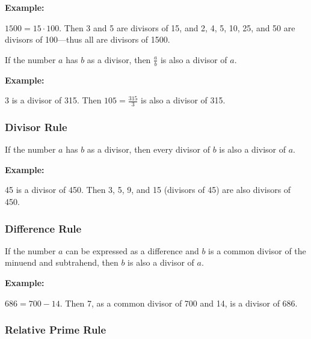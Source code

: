\textbf{Example:}
\vspace{\baselineskip}
 

\( 1500 = 15 \cdot 100 \). Then 3 and 5 are divisors of 15, and 2, 4, 5, 10, 25, and 50 are divisors of 100—thus all are divisors of 1500.


If the number \( a \) has \( b \) as a divisor, then \( \frac{a}{b} \) is also a divisor of \( a \). \\
\vspace{\baselineskip}

\textbf{Example:}
\vspace{\baselineskip}
 

3 is a divisor of 315. Then \( 105 = \frac{315}{3} \) is also a divisor of 315.

\subsubsection{Divisor Rule}

If the number \( a \) has \( b \) as a divisor, then every divisor of \( b \) is also a divisor of \( a \). \\
\vspace{\baselineskip}

\textbf{Example:}
\vspace{\baselineskip}
 

45 is a divisor of 450. Then 3, 5, 9, and 15 (divisors of 45) are also divisors of 450.

\subsubsection{Difference Rule}

If the number \( a \) can be expressed as a difference and \( b \) is a common divisor of the minuend and subtrahend, then \( b \) is also a divisor of \( a \). \\
\vspace{\baselineskip}

\textbf{Example:}
\vspace{\baselineskip}
 

\( 686 = 700 - 14 \). Then 7, as a common divisor of 700 and 14, is a divisor of 686.

\subsubsection{Relative Prime Rule}

